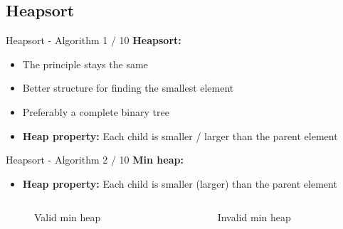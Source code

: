 \subsection{Heapsort}

\begin{frame}{Heapsort - Algorithm 1 / 10}
  \textbf{Heapsort:}
  \begin{itemize}
    \item
      The principle stays the same
    \item
      Better structure for finding the smallest element
  \end{itemize}
  \vspace{1em}
  \begin{itemize}
    \item<2- |handout:1>
      Preferably a complete binary tree
    \item<2- |handout:1>
      \textbf{Heap property:} Each child is smaller / larger than the parent
      element
  \end{itemize}
\end{frame}


\begin{frame}{Heapsort - Algorithm 2 / 10}
  \textbf{Min heap:}
  \begin{itemize}
    \item
      \textbf{Heap property:} Each child is {\color{MainA}smaller}
      (larger) than the parent element
  \end{itemize}
  \begin{columns}%
    \begin{column}[b]{0.45\textwidth}%
      \begin{figure}[!h]%
        \begin{adjustbox}{height=0.75\linewidth}%
          
        \end{adjustbox}
        \caption{Valid min heap}
        \label{fig:minheap_valid}
      \end{figure}
    \end{column}%
    \hspace*{0.1em}%
    \begin{column}[b]{0.45\textwidth}%
      \begin{figure}[!h]%
        \begin{adjustbox}{height=0.75\linewidth}%
          
        \end{adjustbox}
        \caption{Invalid min heap}
        \label{fig:minheap_invalid}
      \end{figure}
    \end{column}
  \end{columns}
\end{frame}

